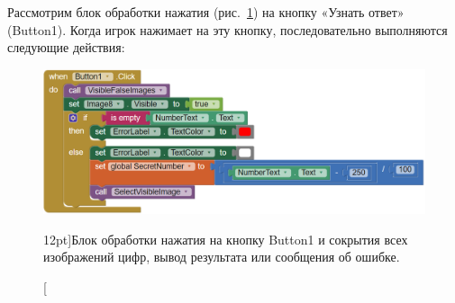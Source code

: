 Рассмотрим блок обработки нажатия (рис.~\ref{fig:block:button:click}) на кнопку «Узнать ответ» (Button1).
Когда игрок нажимает на эту кнопку, последовательно выполняются следующие действия:
\begin{figure}
  \includegraphics{./graphics/programs/guess_numbers/block_Button1Click_AppInventor_2018.png}
    \caption[Блок обработки нажатия на кнопку Button1.][12pt]{Блок обработки нажатия на кнопку Button1 и сокрытия всех изображений цифр, вывод результата или сообщения об ошибке.}
  \label{fig:block:button:click}
\end{figure}
